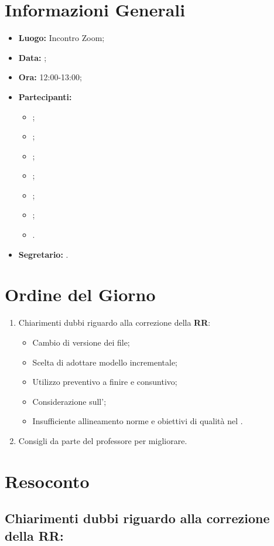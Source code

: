\section{Informazioni Generali}
\begin{itemize}
\item \textbf{Luogo:} Incontro Zoom;
\item \textbf{Data:} \Data;
\item \textbf{Ora:} 12:00-13:00;
\item \textbf{Partecipanti:}
	\begin{itemize}
		\item \BL{}; 
		\item \FF{};
		\item \MM{};
		\item \TG{};
		\item \TL{};
		\item \VD{};
		\item \VT{}.
	\end{itemize} 
\item \textbf{Segretario:} \MM{}.
\end{itemize}

\section{Ordine del Giorno}
\begin{enumerate}
	\item Chiarimenti dubbi riguardo alla correzione della \textbf{RR}:
	\begin{itemize}
        \item Cambio di versione dei file;
        \item Scelta di adottare modello incrementale;
        \item Utilizzo preventivo a finire e consuntivo;
        \item Considerazione sull'\AdR{};
        \item Insufficiente allineamento norme e obiettivi di qualità nel \PdQ{}.
    \end{itemize}
	\item Consigli da parte del professore per migliorare.
\end{enumerate}

\section{Resoconto}
\subsection{Chiarimenti dubbi riguardo alla correzione della RR:}
